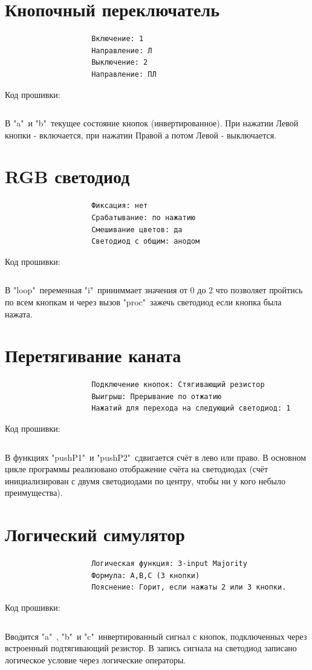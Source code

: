\section{Кнопочный переключатель}
\begin{verbatim}
					Включение: 1
					Направление: Л 
					Выключение: 2 
					Направление: ПЛ
\end{verbatim}
Код прошивки:
\inputminted{cpp}{z1/main.cpp}
В "a"\ и "b"\ текущее состояние кнопок (инвертированное). При нажатии Левой кнопки - включается, при нажатии Правой а потом Левой - выключается.
\section{RGB светодиод}
\begin{verbatim}
					Фиксация: нет
					Срабатывание: по нажатию 
					Смешивание цветов: да
					Светодиод с общим: анодом
\end{verbatim}
Код прошивки:
\inputminted{cpp}{z2/main.cpp}
В "loop"\ переменная "i"\ приниммает значения от 0 до 2 что позволяет пройтись по всем кнопкам и через вызов "proc"\ зажечь светодиод если кнопка была нажата.
\section{Перетягивание каната}
\begin{verbatim}
					Подключение кнопок: Стягивающий резистор
					Выигрыш: Прерывание по отжатию
					Нажатий для перехода на следующий светодиод: 1
\end{verbatim}
Код прошивки:
\inputminted{cpp}{z3/main.cpp}
В функциях "pushP1"\ и "pushP2"\ сдвигается счёт в лево или право. В основном цикле программы реализовано отображение счёта на светодиодах (счёт инициализирован с двумя светодиодами по центру, чтобы ни у кого небыло преимущества).
\section{Логический симулятор}
\begin{verbatim}
					Логическая функция: 3-input Majority
					Формула: A,B,C (3 кнопки)
					Пояснение: Горит, если нажаты 2 или 3 кнопки.
\end{verbatim}
Код прошивки:
\inputminted{cpp}{z4/main.cpp}
Вводится "a"\ , "b"\  и "c"\ инвертированный сигнал с кнопок, подключенных через встроенный подтягивающий резистор. В запись сигнала на светодиод записано логическое условие через логические операторы.